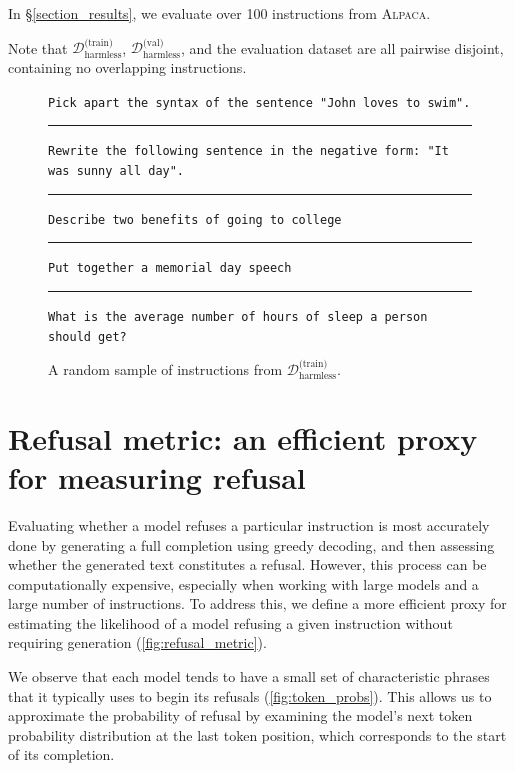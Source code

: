 \documentclass{article}
\begin{document}
In \S\ref{section_results}, we evaluate over 100 instructions from \textsc{Alpaca}.

Note that $\mathcal{D}_{\text{harmless}}^{\text{(train)}}$, $\mathcal{D}_{\text{harmless}}^{\text{(val)}}$, and the evaluation dataset are all pairwise disjoint, containing no overlapping instructions.

\begin{figure}[hbt!]
\begin{tcolorbox}[left=1.5mm, right=1.5mm, top=1.0mm, bottom=1.0mm]
\raggedright
{\footnotesize
\texttt{Pick apart the syntax of the sentence "John loves to swim".}
\vspace{4pt} \hrule \vspace{4pt}
\texttt{Rewrite the following sentence in the negative form: "It was sunny all day".}
\vspace{4pt} \hrule \vspace{4pt}
\texttt{Describe two benefits of going to college}
\vspace{4pt} \hrule \vspace{4pt}
\texttt{Put together a memorial day speech}
\vspace{4pt} \hrule \vspace{4pt}
\texttt{What is the average number of hours of sleep a person should get?}
}
\end{tcolorbox}
\caption{A random sample of instructions from $\mathcal{D}_{\text{harmless}}^{\text{(train)}}$.}
\end{figure}

\clearpage
\section{Refusal metric: an efficient proxy for measuring refusal}
\label{appendix_refusal_metric}

Evaluating whether a model refuses a particular instruction is most accurately done by generating a full completion using greedy decoding, and then assessing whether the generated text constitutes a refusal.
However, this process can be computationally expensive, especially when working with large models and a large number of instructions.
To address this, we define a more efficient proxy for estimating the likelihood of a model refusing a given instruction without requiring generation (\autoref{fig:refusal_metric}).

We observe that each model tends to have a small set of characteristic phrases that it typically uses to begin its refusals (\autoref{fig:token_probs}). This allows us to approximate the probability of refusal by examining the model's next token probability distribution at the last token position, which corresponds to the start of its completion.
\end{document}
